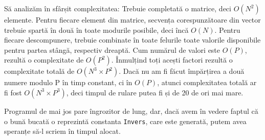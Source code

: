 Să analizăm în sfârșit complexitatea: Trebuie completată o matrice, deci
$O(N^2)$ elemente. Pentru fiecare element din matrice, secvența
corespunzătoare din vector trebuie spartă în două în toate modurile posibile,
deci încă $O(N)$. Pentru fiecare descompunere, trebuie combinate în toate
felurile toate valorile disponibile pentru partea stângă, respectiv
dreaptă. Cum numărul de valori este $O(P)$, rezultă o complexitate de
$O(P^2)$. Înmulțind toți acești factori rezultă o complexitate totală de
$O(N^3 \times P^2)$. Dacă nu am fi făcut împărțirea a două numere modulo P în
timp constant, ci în $O(P)$, atunci complexitatea totală ar fi fost $O(N^3
\times P^3)$, deci timpul de rulare putea fi și de 20 de ori mai mare.

Programul de mai jos pare îngrozitor de lung, dar, dacă avem în vedere faptul
că o bună bucată o reprezintă constanta {\tt Invers}, care este generată,
putem avea speranțe să-l scriem în timpul alocat.

